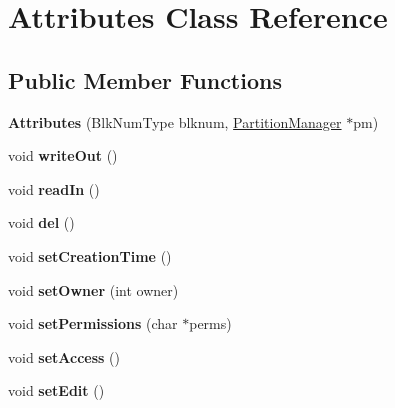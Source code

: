 \hypertarget{classAttributes}{}\section{Attributes Class Reference}
\label{classAttributes}
\subsection*{Public Member Functions}
\begin{DoxyCompactItemize}
\item 
\mbox{\label{classAttributes_a0d6b154029e34f811f0930806768f022}} 
{\bfseries Attributes} (Blk\+Num\+Type blknum, \mbox{\hyperlink{classPartitionManager}{Partition\+Manager}} $\ast$pm)
\item 
\mbox{\label{classAttributes_a7eea700dd80e77a74afdc3c091a178b8}} 
void {\bfseries write\+Out} ()
\item 
\mbox{\label{classAttributes_a6fc0012ff20912b8ee30167fefd1ab85}} 
void {\bfseries read\+In} ()
\item 
\mbox{\label{classAttributes_acf28e724c914f066ecdae788d95b3212}} 
void {\bfseries del} ()
\item 
\mbox{\label{classAttributes_a4caf96b812e181975045a172fe0dc438}} 
void {\bfseries set\+Creation\+Time} ()
\item 
\mbox{\label{classAttributes_a56ab60c4bad40e1a47e096526f3ce57a}} 
void {\bfseries set\+Owner} (int owner)
\item 
\mbox{\label{classAttributes_a15a4348203635ff53a6cd8c2d52c68e3}} 
void {\bfseries set\+Permissions} (char $\ast$perms)
\item 
\mbox{\label{classAttributes_ae4861b7312f8619a6b2988b9456c4604}} 
void {\bfseries set\+Access} ()
\item 
\mbox{\label{classAttributes_aa091d2dba315a124ea4a14308f2553c6}} 
void {\bfseries set\+Edit} ()
\item 
\mbox{\label{classAttributes_a6ed2adf53cd6131c2b22a2782cd0bdcf}} 

\end{DoxyCompactItemize}
